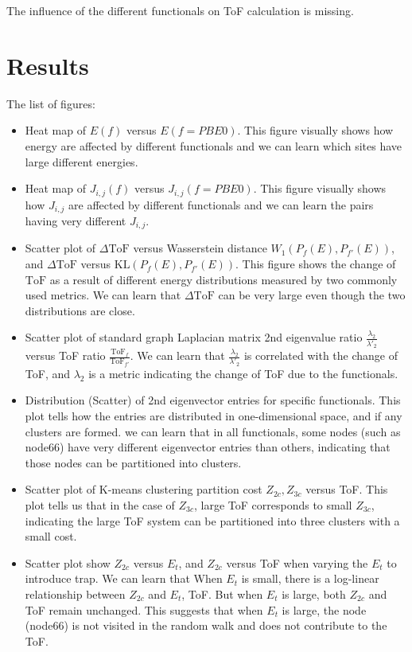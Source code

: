\documentclass[letterpaper,12pt]{article}
\begin{document}
The influence of the different functionals on ToF calculation is missing. 



\section{Results}
\label{sec:result}
The list of figures:
\begin{itemize}
    \item Heat map of $E(f)$ versus $E(f=PBE0)$. This figure visually shows how energy are affected by different functionals and we can learn which sites have large different energies.
    \item Heat map of $J_{i,j}(f)$ versus $J_{i,j}(f=PBE0)$. This figure visually shows how $J_{i,j}$ are affected by different functionals and we can learn the pairs having very different $J_{i,j}$.
    \item Scatter plot of $\Delta \text{ToF}$ versus Wasserstein distance $W_1 (P_f(E),P_{f'}(E))$, and $\Delta \text{ToF}$ versus $\text{KL}(P_f(E),P_{f'}(E))$. This figure shows the change of $\text{ToF}$ as a result of different energy distributions measured by two commonly used metrics. We can learn that $\Delta \text{ToF}$ can be very large even though the two distributions are close.
    \item Scatter plot of standard graph Laplacian matrix 2nd eigenvalue ratio $\frac{\lambda_{2}}{\lambda'_{2}}$ versus ToF ratio $\frac{\text{ToF}_f}{\text{ToF}_{f'}}$. We can learn that $\frac{\lambda_{2}}{\lambda'_{2}}$ is correlated with the change of ToF, and $\lambda_{2}$ is a metric indicating the change of ToF due to the functionals. 
    \item Distribution (Scatter) of 2nd eigenvector entries for specific functionals. This plot tells how the entries are distributed in one-dimensional space, and if any clusters are formed.
    we can learn that in all functionals, some nodes (such as node66) have very different eigenvector entries than others, indicating that those nodes can be partitioned into clusters.
    \item Scatter plot of K-means clustering partition cost $Z_{2c},Z_{3c}$ versus ToF. This plot tells us that in the case of $Z_{3c}$, large ToF corresponds to small $Z_{3c}$, indicating the large ToF system can be partitioned into three clusters with a small cost. 
    \item Scatter plot show $Z_{2c}$ versus $E_{t}$, and $Z_{2c}$ versus ToF when varying the $E_{t}$ to introduce trap. We can learn that When $E_{t}$ is small, there is a log-linear relationship between $Z_{2c}$ and $E_{t}$, ToF. But when $E_{t}$ is large, both $Z_{2c}$ and ToF remain unchanged. This suggests that when $E_{t}$ is large, the node (node66) is not visited in the random walk and does not contribute to the ToF.

\end{itemize}
\end{document}
